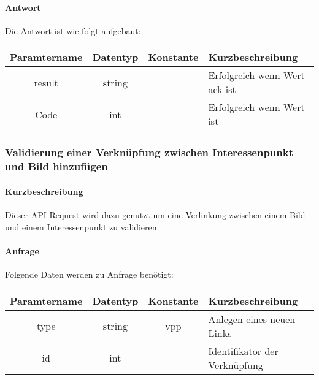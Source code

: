 \paragraph{Antwort}Die Antwort ist wie folgt aufgebaut:
\begin{table}[H]
	\begin{tabular}{|c|c|c|p{6.5cm}|}
		\hline
		\textbf{Paramtername} & \textbf{Datentyp} & \textbf{Konstante} & \textbf{Kurzbeschreibung}                                                                                               \\ \hline
		result              & string           &                 & Erfolgreich wenn Wert {\glqq ack\grqq} ist \\ \hline
		Code                & int              &                 & Erfolgreich wenn Wert {\glqq 0\grqq} ist \\ \hline
	\end{tabular}
\end{table}
\subsubsection{Validierung einer Verknüpfung zwischen Interessenpunkt und Bild hinzufügen}
\paragraph{Kurzbeschreibung}Dieser API-Request wird dazu genutzt um eine Verlinkung zwischen einem Bild und einem Interessenpunkt zu validieren.
\paragraph{Anfrage}Folgende Daten werden zu Anfrage benötigt:
\begin{table}[H]
	\begin{tabular}{|c|c|c|p{6.5cm}|}
		\hline
		\textbf{Paramtername} & \textbf{Datentyp} & \textbf{Konstante} & \textbf{Kurzbeschreibung}                                                                                               \\ \hline
		type                & string            & vpp                & Anlegen eines neuen Links \\ \hline
		id                  & int               &                    & Identifikator der Verknüpfung \\ \hline
	\end{tabular}
\end{table}
